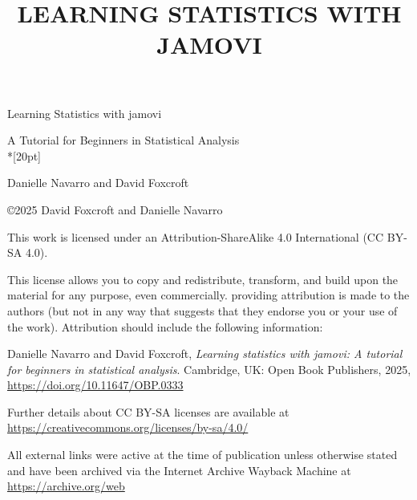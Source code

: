 \documentclass[
  a4paper,
]{book}
\title{LEARNING STATISTICS WITH JAMOVI}
\author{}
\date{}
\let\oldmaketitle\maketitle
\begin{document}
\frontmatter
\maketitle
\begin{center}

\end{center}
\pagestyle{empty}
\let\maketitle\oldmaketitle
\maketitle
\mainmatter
\let\footnote=\endnote

\hspace{0pt}
\vfill
\begin{center}

\Huge{Learning Statistics with jamovi}

\Large{A Tutorial for Beginners in Statistical Analysis}\\*[20pt]

\normalsize{Danielle Navarro and David Foxcroft}

\vfill
\end{center}
\hspace{0pt}
\pagebreak

\hspace{0pt}
\vfill

\copyright 2025 David Foxcroft and Danielle Navarro

This work is licensed under an Attribution-ShareAlike 4.0 International (CC BY-SA 4.0).

This license allows you to copy and redistribute, transform, and build upon the material for any purpose, even commercially. providing attribution is made to the authors (but not in any way that suggests that they endorse you or your use of the work). Attribution should include the following information:

Danielle Navarro and David Foxcroft, \textit{Learning statistics with jamovi: A tutorial for beginners in statistical analysis}. Cambridge, UK: Open Book Publishers, 2025, \url{https://doi.org/10.11647/OBP.0333}

Further details about CC BY-SA licenses are available at \\ \url{https://creativecommons.org/licenses/by-sa/4.0/}

All external links were active at the time of publication unless otherwise stated and have been archived via the Internet Archive Wayback Machine at \\ \url{https://archive.org/web}
\end{document}
